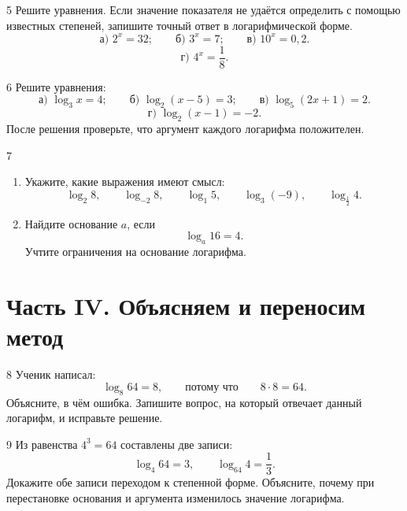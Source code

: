 \begin{homeworktask}{5}
  Решите уравнения. Если значение показателя не удаётся определить с помощью
  известных степеней, запишите точный ответ в логарифмической форме.
  \[
    \text{а) }2^x=32;
    \qquad
    \text{б) }3^x=7;
    \qquad
    \text{в) }10^x=0{,}2.
  \]
  \[
    \text{г) }4^x=\frac18.
  \]
\end{homeworktask}
\answerspace{30mm}

\begin{homeworktask}{6}
  Решите уравнения:
  \[
    \text{а) }\log_3 x=4;
    \qquad
    \text{б) }\log_2(x-5)=3;
    \qquad
    \text{в) }\log_5(2x+1)=2.
  \]
  \[
    \text{г) }\log_2(x-1)=-2.
  \]
  После решения проверьте, что аргумент каждого логарифма положителен.
\end{homeworktask}
\answerspace{52mm}

\begin{homeworktask}{7}
  \begin{enumerate}[itemsep=0.45em]
    \item[\textbf{а)}] Укажите, какие выражения имеют смысл:
      \[
        \log_2 8,
        \qquad
        \log_{-2}8,
        \qquad
        \log_1 5,
        \qquad
        \log_3(-9),
        \qquad
        \log_{\frac12}4.
      \]
    \item[\textbf{б)}] Найдите основание \(a\), если
      \[
        \log_a16=4.
      \]
      Учтите ограничения на основание логарифма.
  \end{enumerate}
\end{homeworktask}
\answerspace{36mm}

\newpage
\section*{Часть IV. Объясняем и переносим метод}

\begin{homeworktask}{8}
  Ученик написал:
  \[
    \log_8 64=8,
    \qquad\text{потому что}\qquad 8\cdot8=64.
  \]
  Объясните, в чём ошибка. Запишите вопрос, на который отвечает данный
  логарифм, и исправьте решение.
\end{homeworktask}
\answerspace{38mm}

\begin{homeworktask}{9}
  Из равенства \(4^3=64\) составлены две записи:
  \[
    \log_4 64=3,
    \qquad
    \log_{64}4=\frac13.
  \]
  Докажите обе записи переходом к степенной форме. Объясните, почему при
  перестановке основания и аргумента изменилось значение логарифма.
\end{homeworktask}
\answerspace{43mm}

